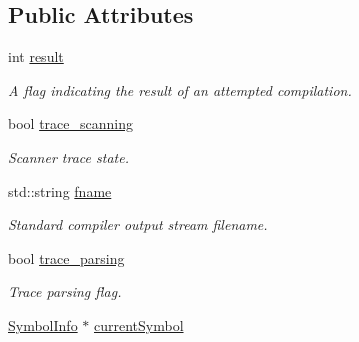\subsection*{Public Attributes}
\begin{DoxyCompactItemize}
\item 
\hypertarget{classCCompiler_ac83135baa1380874cf2e30bc1d3d9294}{int \hyperlink{classCCompiler_ac83135baa1380874cf2e30bc1d3d9294}{result}}\label{classCCompiler_ac83135baa1380874cf2e30bc1d3d9294}

\begin{DoxyCompactList}\small\item\em A flag indicating the result of an attempted compilation. \end{DoxyCompactList}\item 
\hypertarget{classCCompiler_aa9769e9f7417698ce18ab9c668650ad0}{bool \hyperlink{classCCompiler_aa9769e9f7417698ce18ab9c668650ad0}{trace\-\_\-scanning}}\label{classCCompiler_aa9769e9f7417698ce18ab9c668650ad0}

\begin{DoxyCompactList}\small\item\em Scanner trace state. \end{DoxyCompactList}\item 
\hypertarget{classCCompiler_a60b1cadb0db77e19be3b13e80ceade72}{std\-::string \hyperlink{classCCompiler_a60b1cadb0db77e19be3b13e80ceade72}{fname}}\label{classCCompiler_a60b1cadb0db77e19be3b13e80ceade72}

\begin{DoxyCompactList}\small\item\em Standard compiler output stream filename. \end{DoxyCompactList}\item 
\hypertarget{classCCompiler_a9959c74a24cffc0a33e981091b46ef01}{bool \hyperlink{classCCompiler_a9959c74a24cffc0a33e981091b46ef01}{trace\-\_\-parsing}}\label{classCCompiler_a9959c74a24cffc0a33e981091b46ef01}

\begin{DoxyCompactList}\small\item\em Trace parsing flag. \end{DoxyCompactList}\item 
\hypertarget{classCCompiler_a258fcdf75d50f46d255dc1431eaae4c4}{\hyperlink{structSymbolInfo}{Symbol\-Info} $\ast$ \hyperlink{classCCompiler_a258fcdf75d50f46d255dc1431eaae4c4}{current\-Symbol}}\label{classCCompiler_a258fcdf75d50f46d255dc1431eaae4c4}


\end{DoxyCompactItemize}
